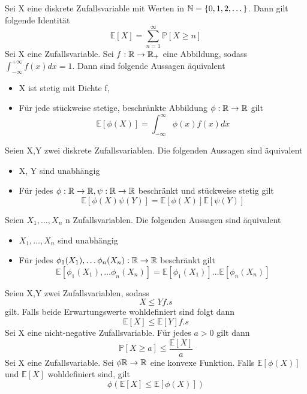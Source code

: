  \newline
Sei X eine diskrete Zufallsvariable mit Werten in \( \mathbb{N} = \{0, 1, 2, \dots \}\). Dann gilt folgende Identität \[ \mathbb{E}[X] = \sum_{n=1}^{\infty} \mathbb{P}[X \geq n]\]
\Satz[4.16] \newline
Sei X eine Zufallsvariable. Sei \( f: \mathbb{R} \rightarrow \mathbb{R}_+ \) eine Abbildung, sodass \( \int_{-\infty}^{+ \infty} f(x)dx = 1\). Dann sind folgende Aussagen äquivalent
\begin{itemize}
    \item X ist stetig mit Dichte f,
    \item Für jede stückweise stetige, beschränkte Abbildung \(\phi: \mathbb{R} \rightarrow \mathbb{R} \) gilt \[ \mathbb{E}[\phi(X)] = \int_{-\infty}^{\infty}\phi (x) f(x)dx\]
\end{itemize}
\Theo[4.17] \newline
Seien X,Y zwei diskrete Zufallsvariablen. Die folgenden Aussagen sind äquivalent
\begin{itemize}
    \item X, Y sind unabhängig
    \item Für jedes \( \phi : \mathbb{R} \rightarrow \mathbb{R}, \psi : \mathbb{R} \rightarrow \mathbb{R} \) beschränkt und stückweise stetig gilt \[ \mathbb{E}[\phi(X)\psi(Y)] = \mathbb{E}[\phi(X)]\mathbb{E}[\psi(Y)]\]
\end{itemize}
\Theo[4.18] \newline
Seien \(X_1, \dots , X_n \) n Zufallsvariablen. Die folgenden Aussagen sind äquivalent
\begin{itemize}
    \item \(X_1, \dots , X_n \) sind unabhängig
    \item Für jedes \( \phi_1 (X_1), \dots \phi_n(X_n ) : \mathbb{R} \rightarrow \mathbb{R} \) beschränkt gilt \[\mathbb{E}[\phi_1(X_1), \dots \phi_n(X_n)] = \mathbb{E}[\phi_1(X_1)] \dots \mathbb{E}[\phi_n(X_n)]\]
\end{itemize}
\Satz[4.19] \newline
Seien X,Y zwei Zufallsvariablen, sodass \[ X \leq Y f.s\] gilt. Falls beide Erwartungswerte wohldefiniert sind folgt dann \[ \mathbb{E}[X] \leq \mathbb{E}[Y] f.s\]
 \newline
Sei X eine nicht-negative Zufallsvariable. Für jedes \( a > 0\) gilt dann \[ \mathbb{P}[X \geq a ] \leq \frac{\mathbb{E}[X]}{a}\]
 \newline
Sei X eine Zufallsvariable. Sei \( \phi \mathbb{R} \rightarrow \mathbb{R} \) eine konvexe Funktion. Falls \( \mathbb{E}[\phi(X)]\) und \( \mathbb{E}[X]\) wohldefiniert sind, gilt \[ \phi(\mathbb{E}[X] \leq \mathbb{E}[\phi(X)])\]
